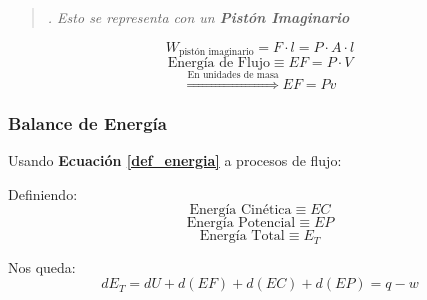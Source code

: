     \begin{quote}
        \textit{. Esto se representa con un \textbf{Pistón Imaginario}}
    \end{quote}
    
    \[W_{\text{pistón imaginario}} = F \cdot l = P \cdot A \cdot l\]
    \begin{equation}
    \label{en_flujo}
        \text{Energía de Flujo} \equiv EF = P \cdot V
    \end{equation}
    \[\overset{\text{En unidades de masa}}{\Rightarrow} EF = Pv\]
    
        \subsubsection{Balance de Energía}
        
        Usando \textbf{Ecuación \ref{def_energia}} a procesos de flujo:
        
        Definiendo:
        \[\text{Energía Cinética} \equiv EC\]
        \[\text{Energía Potencial} \equiv EP\]
        \[\text{Energía Total} \equiv E_{T}\]
        
        Nos queda:
        \begin{equation}
        \label{en_total_flujo}
            dE_{T}=dU+d(EF)+d(EC)+d(EP)=q-w
        \end{equation}
        

